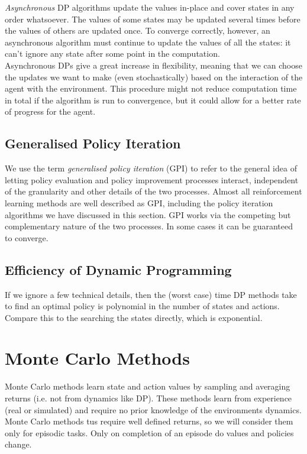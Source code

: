\emph{Asynchronous} DP algorithms update the values in-place and cover states in any order whatsoever. The values of some states may be updated several times before the values of others are updated once. To converge correctly, however, an asynchronous algorithm must continue to update the values of all the states: it can’t ignore any state after some point in the computation.\\

Asynchronous DPs give a great increase in flexibility, meaning that we can choose the updates we want to make (even stochastically) based on the interaction of the agent with the environment. This procedure might not reduce computation time in total if the algorithm is run to convergence, but it could allow for a better rate of progress for the agent.

\subsection{Generalised Policy Iteration}
We use the term \emph{generalised policy iteration} (GPI) to refer to the general idea of letting policy evaluation and policy improvement processes interact, independent of the granularity and other details of the two processes. Almost all reinforcement learning methods are well described as GPI, including the policy iteration algorithms we have discussed in this section. GPI works via the competing but complementary nature of the two processes. In some cases it can be guaranteed to converge. 

\subsection{Efficiency of Dynamic Programming}
If we ignore a few technical details, then the (worst case) time DP methods take to find an optimal policy is polynomial in the number of states and actions. Compare this to the searching the states directly, which is exponential.


\clearpage
\section{Monte Carlo Methods}
Monte Carlo methods learn state and action values by sampling and averaging returns (i.e. not from dynamics like DP). These methods learn from experience (real or simulated) and require no prior knowledge of the environments dynamics.\\

Monte Carlo methods tus require well defined returns, so we will consider them only for episodic tasks. Only on completion of an episode do values and policies change.\\

